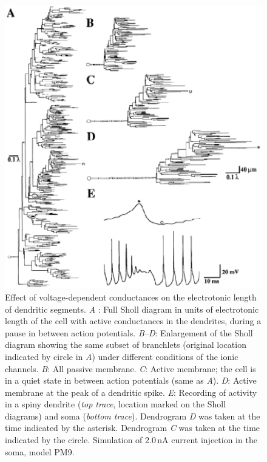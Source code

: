 \documentclass[12pt]{article}
\begin{document}
\clearpage

\begin{figure}[h]
\centering
   \includegraphics[scale=0.75]{figures/Fig.1.12.eps}
   \caption{Effect of voltage-dependent conductances on the electrotonic length of dendritic segments. {\it A} : Full Sholl diagram in units of electrotonic length of the cell with active conductances in the dendrites, during a pause in between action potentials. {\it B--D}: Enlargement of the Sholl diagram showing the same subset of branchlets (original location indicated by circle in {\it A}) under different conditions of the ionic channels. {\it B}: All passive membrane. {\it C}: Active membrane; the cell is in a quiet state in between action potentials (same as {\it A}). {\it D}: Active membrane at the peak of a dendritic spike. {\it E}: Recording of activity in a spiny dendrite ({\em top trace}, location marked on the Sholl diagrams) and soma ({\em bottom trace}). Dendrogram {\it D} was taken at the time indicated by the asterisk. Dendrogram {\it C} was taken at the time indicated by the circle. Simulation of 2.0\,nA current injection in the soma, model PM9.}
   \label{fig:DS1.12}
\end{figure}
\end{document}
